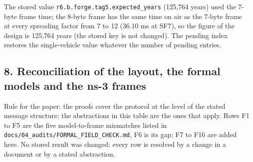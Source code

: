 The stored value \texttt{r6.b.forge.tag5.expected\_years} (125,764 years) used the 7-byte frame time; the 8-byte frame has the same time on air as the 7-byte frame at every spreading factor from 7 to 12 (36.10 ms at SF7), so the figure of the design is 125,764 years (the stored key is not changed). The pending index restores the single-vehicle value whatever the number of pending entries.

\subsection*{8. Reconciliation of the layout, the formal models and the ns-3 frames}

Rule for the paper: the proofs cover the protocol at the level of the stated message structure; the abstractions in this table are the ones that apply. Rows F1 to F5 are the five model-to-frame mismatches listed in \texttt{docs/04\_audits/FORMAL\_FIELD\_CHECK.md}, F6 is its gap; F7 to F16 are added here. No stored result was changed: every row is resolved by a change in a document or by a stated abstraction.

